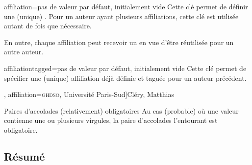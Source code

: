 \documentclass[french,nolocaltoc]{nwejmart}
\newtheorem[title=Fait,style=definition]{fact}
\begin{document}
\begin{docKey}{affiliation}{={}}{pas de valeur par défaut,
    initialement vide}
  Cette clé permet de définir une (unique) . Pour un auteur
  ayant plusieurs affiliations, cette clé est utilisée autant de fois que
  nécessaire.

  En outre, chaque affiliation peut recevoir un  en vue d'être
  réutilisée pour un autre auteur.
\end{docKey}

\begin{docKey}{affiliationtagged}{={}}{pas de valeur par défaut,
    initialement vide}
  Cette clé permet de spécifier une (unique) affiliation déjà définie et taguée
  pour un auteur précédent.
\end{docKey}


\begin{bodycode}[listing options={deletekeywords={author}}]
\author[
  affiliation={Laboratoire \textsc{sphere}, Université Paris Diderot}
  ]{Bustamante, Martha-Cecilia}
\author[
  affiliation=[aff2]{\textsc{lpma}, Université Pierre et Marie Curie},
  affiliation={\textsc{ghdso}, Université Paris-Sud}]{Cléry, Matthias}
\author[
  affiliationtagged={aff2}
]{Mazliak, Laurent}
\end{bodycode}

\begin{dbwarning}{Paires d'accolades
    (relativement) obligatoires}{}
  Au cas (probable) où une valeur  contienne une ou plusieurs
  virgules, la paire d'accolades l'entourant est obligatoire.
\end{dbwarning}

\subsection{Résumé}
\label{sec-resume}
\end{document}
